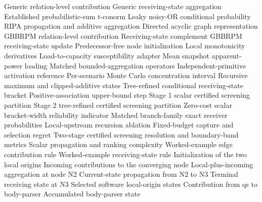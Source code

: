 \newcommand{\seteqdescription}[2]{\expandafter\gdef\csname eqdesc@#1\endcsname{#2}}
\seteqdescription{1-1}{Generic relation-level contribution}
\seteqdescription{1-2}{Generic receiving-state aggregation}
\seteqdescription{2-1}{Established probabilistic-sum t-conorm}
\seteqdescription{2-2}{Leaky noisy-OR conditional probability}
\seteqdescription{2-3}{RIPA propagation and additive aggregation}
\seteqdescription{3-1}{Directed acyclic graph representation}
\seteqdescription{3-2}{GBBRPM relation-level contribution}
\seteqdescription{3-3}{Receiving-state complement}
\seteqdescription{3-4}{GBBRPM receiving-state update}
\seteqdescription{3-5}{Predecessor-free node initialization}
\seteqdescription{3-6}{Local monotonicity derivatives}
\seteqdescription{3-7}{Load-to-capacity susceptibility adapter}
\seteqdescription{3-8}{Mean snapshot apparent-power loading}
\seteqdescription{3-9}{Matched bounded-aggregation operators}
\seteqdescription{3-10}{Independent-primitive activation reference}
\seteqdescription{3-11}{Per-scenario Monte Carlo concentration interval}
\seteqdescription{3-12}{Recursive maximum and clipped-additive states}
\seteqdescription{3-13}{Tree-refined conditional receiving-state bracket}
\seteqdescription{3-14}{Positive-association upper-bound step}
\seteqdescription{3-14a}{Stage 1 scalar certified screening partition}
\seteqdescription{3-14b}{Stage 2 tree-refined certified screening partition}
\seteqdescription{3-14c}{Zero-cost scalar bracket-width reliability indicator}
\seteqdescription{3-15}{Matched branch-family exact receiver probabilities}
\seteqdescription{3-16}{Local-upstream recursion ablation}
\seteqdescription{3-17}{Fixed-budget capture and selection regret}
\seteqdescription{3-17a}{Two-stage certified screening resolution and boundary-band metrics}
\seteqdescription{3-18}{Scalar propagation and ranking complexity}
\seteqdescription{A-1}{Worked-example edge contribution rule}
\seteqdescription{A-2}{Worked-example receiving-state rule}
\seteqdescription{A-3}{Initialization of the two local origins}
\seteqdescription{A-4}{Incoming contributions to the converging node}
\seteqdescription{A-5}{Local-plus-incoming aggregation at node N2}
\seteqdescription{A-6}{Current-state propagation from N2 to N3}
\seteqdescription{A-7}{Terminal receiving state at N3}
\seteqdescription{B-1}{Selected software local-origin states}
\seteqdescription{B-2}{Contribution from qs to body-parser}
\seteqdescription{B-3}{Accumulated body-parser state}

